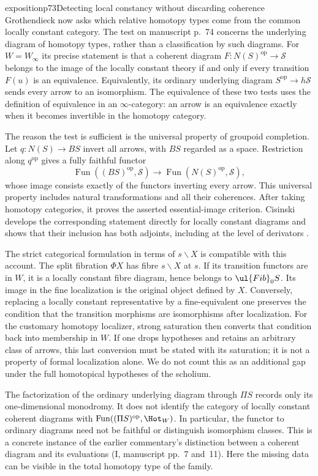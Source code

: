 \begin{dcomment}{exposition}{p73}{Detecting local constancy without discarding coherence}
Grothendieck now asks which relative homotopy types come from the common locally constant category. The test on manuscript p.~74 concerns the underlying diagram of homotopy types, rather than a classification by such diagrams. For $W=W_\infty$ its precise statement is that a coherent diagram $F:N(S)^{\mathrm{op}}\to\mathcal S$ belongs to the image of the locally constant theory if and only if every transition $F(u)$ is an equivalence. Equivalently, its ordinary underlying diagram $S^{\mathrm{op}}\to h\mathcal S$ sends every arrow to an isomorphism. The equivalence of these two tests uses the definition of equivalence in an $\infty$-category: an arrow is an equivalence exactly when it becomes invertible in the homotopy category.

The reason the test is sufficient is the universal property of groupoid completion. Let $q:N(S)\to B S$ invert all arrows, with $BS$ regarded as a space. Restriction along $q^{\mathrm{op}}$ gives a fully faithful functor
\[
 \operatorname{Fun}((BS)^{\mathrm{op}},\mathcal S)
 \longrightarrow\operatorname{Fun}(N(S)^{\mathrm{op}},\mathcal S),
\]
whose image consists exactly of the functors inverting every arrow. This universal property includes natural transformations and all their coherences. After taking homotopy categories, it proves the asserted essential-image criterion. Cisinski develops the corresponding statement directly for locally constant diagrams and shows that their inclusion has both adjoints, including at the level of derivators \citep[Proposition~3.9 and Theorem~3.12]{Cisinski2009LocallyConstant}.

The strict categorical formulation in terms of $s\backslash X$ is compatible with this account. The split fibration $\Phi X$ has fibre $s\backslash X$ at $s$. If its transition functors are in $W$, it is a locally constant fibre diagram, hence belongs to $\ul{Fib}_0S$. Its image in the fine localization is the original object defined by $X$. Conversely, replacing a locally constant representative by a fine-equivalent one preserves the condition that the transition morphisms are isomorphisms after localization. For the customary homotopy localizer, strong saturation then converts that condition back into membership in $W$. If one drops hypotheses and retains an arbitrary class of arrows, this last conversion must be stated with its saturation; it is not a property of formal localization alone. We do not count this as an additional gap under the full homotopical hypotheses of the scholium.

The factorization of the ordinary underlying diagram through $\Pi S$ records only its one-dimensional monodromy. It does not identify the category of locally constant coherent diagrams with $\operatorname{Fun}((\Pi S)^{\mathrm{op}},\Hot_W)$. In particular, the functor to ordinary diagrams need not be faithful or distinguish isomorphism classes. This is a concrete instance of the earlier commentary's distinction between a coherent diagram and its evaluations (I, manuscript pp.~7 and~11). Here the missing data can be visible in the total homotopy type of the family.
\end{dcomment}

